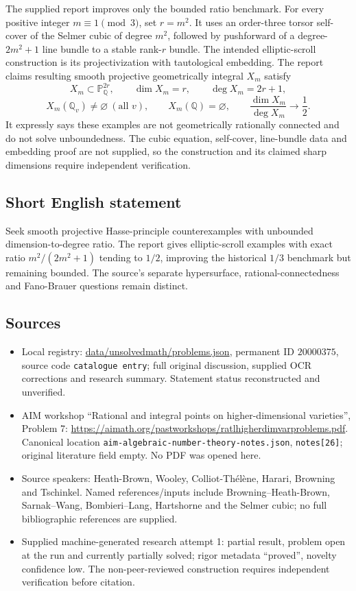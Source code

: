 \documentclass[11pt]{article}
\newcommand{\Q}{\mathbb{Q}}
\newcommand{\PP}{\mathbb{P}}
\begin{document}
The supplied report improves only the bounded ratio benchmark. For every positive integer $m\equiv1\pmod3$, set $r=m^2$. It uses an order-three torsor self-cover of the Selmer cubic of degree $m^2$, followed by pushforward of a degree-$2m^2+1$ line bundle to a stable rank-$r$ bundle. The intended elliptic-scroll construction is its projectivization with tautological embedding. The report claims resulting smooth projective geometrically integral $X_m$ satisfy
\[
 X_m\subset\PP^{2r}_{\Q},\qquad \dim X_m=r,\qquad\deg X_m=2r+1,
\]
\[
 X_m(\Q_v)\ne\varnothing\ (\text{all }v),\qquad X_m(\Q)=\varnothing,\qquad
 \frac{\dim X_m}{\deg X_m}\longrightarrow\frac12.
\]
It expressly says these examples are not geometrically rationally connected and do not solve unboundedness. The cubic equation, self-cover, line-bundle data and embedding proof are not supplied, so the construction and its claimed sharp dimensions require independent verification.
\subsection{Short English statement}
Seek smooth projective Hasse-principle counterexamples with unbounded dimension-to-degree ratio. The report gives elliptic-scroll examples with exact ratio $m^2/(2m^2+1)$ tending to $1/2$, improving the historical $1/3$ benchmark but remaining bounded. The source's separate hypersurface, rational-connectedness and Fano-Brauer questions remain distinct.
\subsection{Sources}
\begin{itemize}
\item Local registry: \url{data/unsolvedmath/problems.json}, permanent ID $20000375$, source code \texttt{catalogue entry}; full original discussion, supplied OCR corrections and research summary. Statement status reconstructed and unverified.
\item AIM workshop ``Rational and integral points on higher-dimensional varieties'', Problem 7: \url{https://aimath.org/pastworkshops/ratlhigherdimvarproblems.pdf}. Canonical location \texttt{aim-algebraic-number-theory-notes.json}, \texttt{notes[26]}; original literature field empty. No PDF was opened here.
\item Source speakers: Heath-Brown, Wooley, Colliot-Th\'el\`ene, Harari, Browning and Tschinkel. Named references/inputs include Browning--Heath-Brown, Sarnak--Wang, Bombieri--Lang, Hartshorne and the Selmer cubic; no full bibliographic references are supplied.
\item Supplied machine-generated research attempt 1: partial result, problem open at the run and currently partially solved; rigor metadata ``proved'', novelty confidence low. The non-peer-reviewed construction requires independent verification before citation.
\end{itemize}
\end{document}
